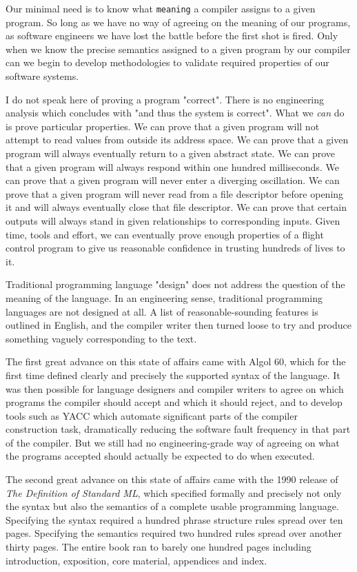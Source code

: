 Our minimal need is to know what {\tt meaning} a compiler assigns to a 
given program.  So long as we have no way of agreeing on the meaning 
of our programs, as software engineers we have lost the battle before 
the first shot is fired.  Only when we know the precise semantics 
assigned to a given program by our compiler can we begin to develop 
methodologies to validate required properties of our software 
systems. 

I do not speak here of proving a program "correct". There is no 
engineering analysis which concludes with "and thus the system is 
correct".  What we {\it can} do is prove particular properties. We can 
prove that a given program will not attempt to read values from 
outside its address space.  We can prove that a given program will 
always eventually return to a given abstract state.  We can prove that 
a given program will always respond within one hundred milliseconds. 
We can prove that a given program will never enter a diverging 
oscillation.  We can prove that a given program will never read from a 
file descriptor before opening it and will always eventually close 
that file descriptor.  We can prove that certain outputs will always 
stand in given relationships to corresponding inputs.  Given time, 
tools and effort, we can eventually prove enough properties of a 
flight control program to give us reasonable confidence in trusting 
hundreds of lives to it. 


Traditional programming language "design" does not address the question  
of the meaning of the language.  In an engineering sense, traditional 
programming languages are not designed at all.  A list of reasonable-sounding 
features is outlined in English, and the compiler writer then turned loose 
to try and produce something vaguely corresponding to the text. 

The first great advance on this state of affairs came with Algol 60, 
which for the first time defined clearly and precisely the supported 
syntax of the language.  It was then possible for language designers 
and compiler writers to agree on which programs the compiler should 
accept and which it should reject, and to develop tools such as 
{\sc YACC} which automate significant parts of the compiler construction 
task, dramatically reducing the software fault frequency in that part 
of the compiler.  But we still had no engineering-grade way of 
agreeing on what the programs accepted should actually be expected to 
do when executed. 

The second great advance on this state of affairs came with the 1990 
release of {\it The Definition of Standard ML}, which specified formally and 
precisely not only the syntax but also the semantics of a complete usable 
programming language.  Specifying the syntax required a hundred phrase 
structure rules spread over ten pages.  Specifying the semantics 
required two hundred rules spread over another thirty pages.  The 
entire book ran to barely one hundred pages including introduction, 
exposition, core material, appendices and index. 

